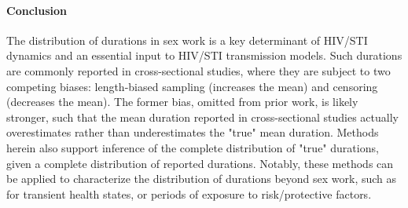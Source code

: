 \paragraph{Conclusion}
The distribution of durations in sex work is
a key determinant of HIV/STI dynamics and
an essential input to HIV/STI transmission models.
Such durations are commonly reported in cross-sectional studies,
where they are subject to two competing biases:
length-biased sampling (increases the mean)
and censoring (decreases the mean).
The former bias, omitted from prior work, is likely stronger, such that
the mean duration reported in cross-sectional studies
actually overestimates rather than underestimates the "true" mean duration.
Methods herein also support inference of
the complete distribution of "true" durations,
given a complete distribution of reported durations.
Notably, these methods can be applied to characterize
the distribution of durations beyond sex work, such as for
transient health states, or periods of exposure to risk/protective factors.
